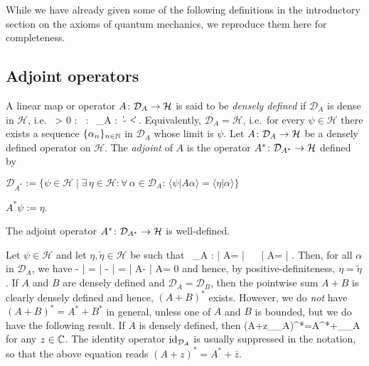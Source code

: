

While we have already given some of the following definitions in the introductory section on the axioms of quantum mechanics, we reproduce them here for completeness. 

\subsection{Adjoint operators}

\bd
A linear map or operator $A\colon\mathcal{D}_A\to\mathcal{H}$ is said to be \emph{densely defined} if $\mathcal{D}_A$ is dense in $\mathcal{H}$, i.e.
\bse
\forall \, \varepsilon > 0 : \forall \, \psi\in {} : \exists \, \alpha \in {}_A : \ \|\alpha - \psi\|< \varepsilon.
\ese
\ed
Equivalently, $\overline{\mathcal{D}_A}=\mathcal{H}$, i.e.\ for every $\psi\in\mathcal{H}$ there exists a sequence $\{\alpha_n\}_{n\in\mathbb{N}}$ in $\mathcal{D}_A$ whose limit is $\psi$.
\bd
Let $A\colon \mathcal{D}_A\to \mathcal{H}$ be a densely defined operator on $\mathcal{H}$. The \emph{adjoint} of $A$ is the operator $A^*\colon\mathcal{D}_{A^*}\to\mathcal{H}$ defined by
\ben[label=(\roman*)]
\item $\mathcal{D}_{A^*}:=\{\psi\in\mathcal{H} \mid \exists \, \eta\in \mathcal{H} : \forall \, \alpha \in \mathcal{D}_A : \, \langle \psi | A\alpha \rangle = \langle \eta | \alpha \rangle\}$
\item $A^*\psi:=\eta$.
\een
\ed

\bp
The adjoint operator $A^*\colon\mathcal{D}_{A^*}\to\mathcal{H}$ is well-defined.
\ep

\bq
Let $\psi\in \mathcal{H}$ and let $\eta,\widetilde\eta \in \mathcal{H}$ be such that
\bse
\forall \, \alpha\in {}_A : \quad \langle \psi | A\alpha \rangle = \langle \eta | \alpha \rangle \  \ \langle \psi | A\alpha \rangle = \langle \widetilde \eta | \alpha \rangle.
\ese
Then, for all $\alpha$ in $\mathcal{D}_A$, we have
\bse
\langle \eta - \widetilde \eta | \alpha \rangle
 =  \langle  \eta | \alpha \rangle - \langle \widetilde \eta | \alpha \rangle  =    \langle \psi | A\alpha \rangle- \langle \psi | A\alpha \rangle  =  0
\ese
and hence, by positive-definiteness, $\eta = \widetilde \eta$.
\eq
If $A$ and $B$ are densely defined and $\mathcal{D}_A=\mathcal{D}_B$, then the pointwise sum $A+B$ is clearly densely defined and hence, $(A+B)^*$ exists. However, we do \emph{not} have $(A+B)^*=A^*+B^*$ in general, unless one of $A$ and $B$ is bounded, but we do have the following result.
\bp
If $A$ is densely defined, then 
\bse
(A+z\id_{_A})^*=A^*+\id_{_A}
\ese
for any $z\in\mathbb{C}$.
\ep
The identity operator $\operatorname{id}_{\mathcal{D}_A}$ is usually suppressed in the notation, so that the above equation reads $(A+z)^*=A^*+\overline{z}$.

